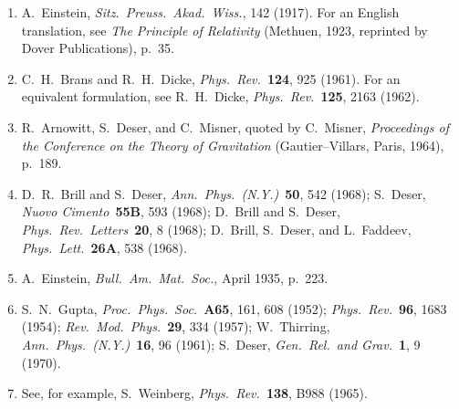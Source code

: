 \begin{enumerate}
  \item {}\label{ch7-ref-1}
  A.~Einstein, \textit{Sitz.\ Preuss.\ Akad.\ Wiss.}, 142 (1917). For an
  English translation, see \textit{The Principle of Relativity} (Methuen,
  1923, reprinted by Dover Publications), p.~35.

  \item {}\label{ch7-ref-2}
  C.~H.~Brans and R.~H.~Dicke, \textit{Phys.\ Rev.}\ \textbf{124}, 925
  (1961). For an equivalent formulation, see R.~H.~Dicke,
  \textit{Phys.\ Rev.}\ \textbf{125}, 2163 (1962).

  \item[2a.] \label{ch7-ref-2a}
  R.~Arnowitt, S.~Deser, and C.~Misner, quoted by C.~Misner,
  \textit{Proceedings of the Conference on the Theory of Gravitation}
  (Gautier--Villars, Paris, 1964), p.~189.

  \item {}\label{ch7-ref-3}
  D.~R.~Brill and S.~Deser, \textit{Ann.\ Phys.\ (N.Y.)}\ \textbf{50},
  542 (1968); S.~Deser, \textit{Nuovo Cimento}\ \textbf{55B}, 593 (1968);
  D.~Brill and S.~Deser, \textit{Phys.\ Rev.\ Letters}\ \textbf{20}, 8
  (1968); D.~Brill, S.~Deser, and L.~Faddeev, \textit{Phys.\ Lett.}\
  \textbf{26A}, 538 (1968).

  \item {}\label{ch7-ref-4}
  A.~Einstein, \textit{Bull.\ Am.\ Mat.\ Soc.}, April 1935, p.~223.

  \item {}\label{ch7-ref-5}
  S.~N.~Gupta, \textit{Proc.\ Phys.\ Soc.}\ \textbf{A65}, 161, 608
  (1952); \textit{Phys.\ Rev.}\ \textbf{96}, 1683 (1954);
  \textit{Rev.\ Mod.\ Phys.}\ \textbf{29}, 334 (1957); W.~Thirring,
  \textit{Ann.\ Phys.\ (N.Y.)}\ \textbf{16}, 96 (1961); S.~Deser,
  \textit{Gen.\ Rel.\ and Grav.}\ \textbf{1}, 9 (1970).

  \item {}\label{ch7-ref-6}
  See, for example, S.~Weinberg, \textit{Phys.\ Rev.}\ \textbf{138},
  B988 (1965).
\end{enumerate}
